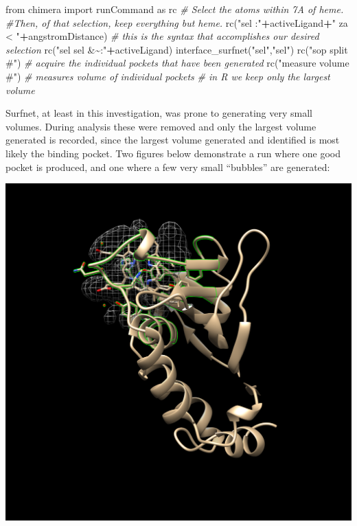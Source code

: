 \documentclass[a4paper, nobind]{templates/ociamthesis}
\newenvironment{Shaded}{\begin{snugshade}}{\end{snugshade}}
\newcommand{\CommentTok}[1]{\textcolor[rgb]{0.56,0.35,0.01}{\textit{#1}}}
\newcommand{\ImportTok}[1]{#1}
\newcommand{\NormalTok}[1]{#1}
\newcommand{\OperatorTok}[1]{\textcolor[rgb]{0.81,0.36,0.00}{\textbf{#1}}}
\newcommand{\StringTok}[1]{\textcolor[rgb]{0.31,0.60,0.02}{#1}}
\renewenvironment{Shaded}
{
  \vspace{10pt}%
  \begin{snugshade}%
}{%
  \end{snugshade}%
  \vspace{8pt}%
}
\let\origfigure\figure
\let\endorigfigure\endfigure
\renewenvironment{figure}[1][2] {
    \expandafter\origfigure\expandafter[H]
} {
    \endorigfigure
}
\begin{document}
\begin{Shaded}
\begin{Highlighting}[]
\ImportTok{from}\NormalTok{ chimera }\ImportTok{import}\NormalTok{ runCommand }\ImportTok{as}\NormalTok{ rc}
\CommentTok{\# Select the atoms within 7A of heme. }
\CommentTok{\#Then, of that selection, keep everything but heme.}
\NormalTok{rc(}\StringTok{"sel :"}\OperatorTok{+}\NormalTok{activeLigand}\OperatorTok{+}\StringTok{" za \textless{} "}\OperatorTok{+}\NormalTok{angstromDistance)}
\CommentTok{\# this is the syntax that accomplishes our desired selection}
\NormalTok{rc(}\StringTok{"sel sel \&\textasciitilde{}:"}\OperatorTok{+}\NormalTok{activeLigand) }
\NormalTok{interface\_surfnet(}\StringTok{"sel"}\NormalTok{,}\StringTok{"sel"}\NormalTok{)}
\NormalTok{rc(}\StringTok{"sop split \#"}\NormalTok{) }\CommentTok{\# acquire the individual pockets that have been generated}
\NormalTok{rc(}\StringTok{"measure volume \#"}\NormalTok{) }\CommentTok{\# measures volume of individual pockets}
\CommentTok{\# in R we keep only the largest volume}
\end{Highlighting}
\end{Shaded}

Surfnet, at least in this investigation, was prone to generating very small volumes. During analysis these were removed and only the largest volume generated is recorded, since the largest volume generated and identified is most likely the binding pocket. Two figures below demonstrate a run where one good pocket is produced, and one where a few very small ``bubbles'' are generated:

\begin{figure}

{\centering \includegraphics[width=0.7\linewidth]{figures/1B2V.good} 

}

\caption{Good Example of Surfnet Run (1B2V)}\label{fig:goodExample}
\end{figure}
\end{document}

